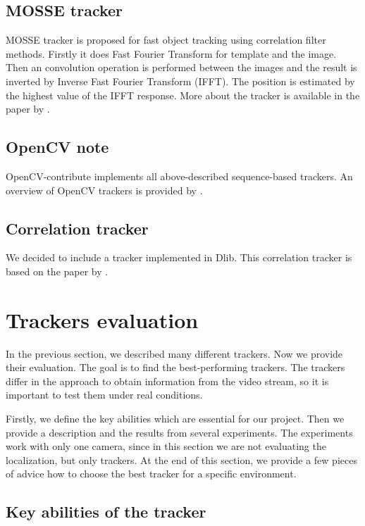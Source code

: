 \subsection*{MOSSE tracker}
MOSSE tracker is proposed for fast object tracking using correlation filter
methods. Firstly it does Fast Fourier Transform for template and the image.
Then an convolution operation is performed between the images and the result is
inverted by Inverse Fast Fourier Transform (IFFT). The position is estimated by
the highest value of the IFFT response. More about the tracker is available in
the paper by \citet*{mosse}.

\subsection*{OpenCV note}
OpenCV-contribute implements all above-described sequence-based trackers. An
overview of OpenCV trackers is provided by \citet*{opencv-trackers}.

\subsection*{Correlation tracker}
We decided to include a tracker implemented in Dlib. This
correlation tracker is based on the paper by \citet*{correlation}.


\section{Trackers evaluation}

In the previous section, we described many different trackers. Now we provide
their evaluation. The goal is to find the best-performing trackers. The
trackers differ in the approach to obtain information from the video stream, so
it is important to test them under real conditions.

Firstly, we define the key abilities which are essential for our project. Then
we provide a description and the results from several experiments. The
experiments work with only one camera, since in this section we are not
evaluating the localization, but only trackers. At the end of this section, we
provide a few pieces of advice how to choose the best tracker for a specific
environment.

\subsection*{Key abilities of the tracker}

